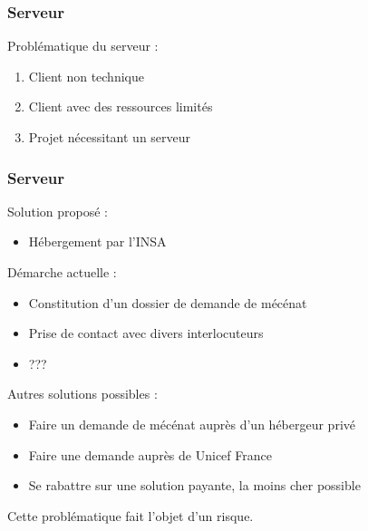 \begin{frame}
	\frametitle{Serveur}

    Problématique du serveur :
      \begin{enumerate}
        \item Client non technique
        \item Client avec des ressources limités
        \item Projet nécessitant un serveur
      \end{enumerate}
      
\end{frame}


\begin{frame}
	\frametitle{Serveur}
	Solution proposé :
	\begin{itemize}	
    \item Hébergement par l'INSA
    \end{itemize}
    Démarche actuelle :
      \begin{itemize}
        \item Constitution d'un dossier de demande de mécénat
        \item Prise de contact avec divers interlocuteurs
        \item ???
      \end{itemize}
    Autres solutions possibles :
      \begin{itemize}
        \item Faire un demande de mécénat auprès d'un hébergeur privé
        \item Faire une demande auprès de Unicef France
        \item Se rabattre sur une solution payante, la moins cher possible
      \end{itemize}
    \begin{center}
    \begin{tiny}
    Cette problématique fait l'objet d'un risque.
    \end{tiny}
    \end{center}
\end{frame}